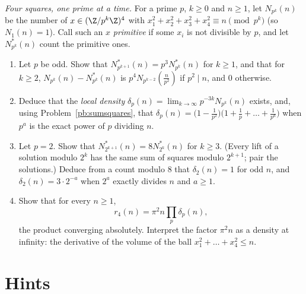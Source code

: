 \begin{exercise}[Journey]\label{pb:densities}
\emph{Four squares, one prime at a time.} For a prime $p$, $k\ge0$ and $n\ge1$, let $N_{p^k}(n)$ be the number of $x\in(\Z/p^k\Z)^4$ with
$x_1^2+x_2^2+x_3^2+x_4^2\equiv n\pmod{p^k}$ (so $N_1(n)=1$). Call such an $x$ \emph{primitive} if some $x_i$ is not divisible by $p$, and let $N^*_{p^k}(n)$ count the
primitive ones.
\begin{enumerate}[label=(\alph*)]
\item Let $p$ be odd. Show that $N^*_{p^{k+1}}(n)=p^3N^*_{p^k}(n)$ for $k\ge1$, and that for $k\ge2$, $N_{p^k}(n)-N^*_{p^k}(n)$ is $p^4N_{p^{k-2}}(\frac n{p^2})$ if
$p^2\mid n$, and $0$ otherwise.
\item Deduce that the \emph{local density} $\delta_p(n)=\lim_{k\to\infty}p^{-3k}N_{p^k}(n)$ exists, and, using Problem~\ref{pb:sumsquares}, that
$\delta_p(n)=\bigl(1-\frac1{p^2}\bigr)\bigl(1+\frac1p+\dots+\frac1{p^a}\bigr)$ when $p^a$ is the exact power of $p$ dividing $n$.
\item Let $p=2$. Show that $N^*_{2^{k+1}}(n)=8N^*_{2^k}(n)$ for $k\ge3$. (Every lift of a solution modulo $2^k$ has the same sum of squares modulo $2^{k+1}$; pair the
solutions.) Deduce from a count modulo $8$ that $\delta_2(n)=1$ for odd $n$, and $\delta_2(n)=3\cdot2^{-a}$ when $2^a$ exactly divides $n$ and $a\ge1$.
\item Show that for every $n\ge1$,
\[
r_4(n)=\pi^2n\prod_p\delta_p(n),
\]
the product converging absolutely. Interpret the factor $\pi^2n$ as a density at infinity: the derivative of the volume of the ball $x_1^2+\dots+x_4^2\le n$.
\end{enumerate}
\end{exercise}

\section{Hints}

